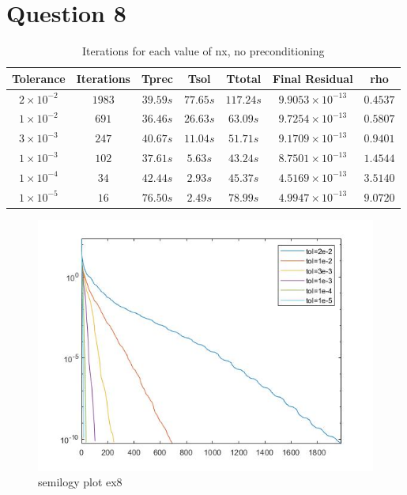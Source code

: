 \documentclass[a4paper, 11pt]{article}
\begin{document}
		
		\section*{Question 8}
		
		\begin{table}[H]
			\centering
			\begin{tabular}{c|c|c|c|c|c|c}
				\textbf{Tolerance} & \textbf{Iterations} & \textbf{Tprec}  & \textbf{Tsol}  & \textbf{Ttotal} & \textbf{Final Residual} & \textbf{rho} \\ \hline
				$2 \times 10^{-2}$ & $1983$	& $ 39.59 s $ 	& $ 77.65 s $ & $ 117.24 s $ 	& $ 9.9053 \times 10^{-13} $ & $ 0.4537 $\\ \hline
				$1 \times 10^{-2}$ & $691$	& $ 36.46 s $ 	& $ 26.63 s $ & $ 63.09 s $ 	& $ 9.7254 \times 10^{-13} $ & $ 0.5807 $\\ \hline
				$3 \times 10^{-3}$ & $247$	& $ 40.67 s $ 	& $ 11.04 s $ & $ 51.71 s $ 	& $ 9.1709 \times 10^{-13} $ & $ 0.9401 $\\ \hline
				$1 \times 10^{-3}$ & $102$	& $ 37.61 s $ 	& $ 5.63 s $ & $ 43.24 s $ 		& $ 8.7501 \times 10^{-13} $ & $ 1.4544 $\\ \hline
				$1 \times 10^{-4}$ & $34$	& $ 42.44 s $ 	& $ 2.93 s $ & $ 45.37 s $ 		& $ 4.5169 \times 10^{-13} $ & $ 3.5140 $\\ \hline
				$1 \times 10^{-5}$ & $16$	& $ 76.50 s $ 	& $ 2.49 s $ & $ 78.99 s $ 		& $ 4.9947 \times 10^{-13} $ & $ 9.0720 $\\ \hline
			\end{tabular}
			\caption{Iterations for each value of nx, no preconditioning}
			\label{table:ex8}
		\end{table}
	
		
		
		\begin{figure}[H]
			\centering
			\includegraphics[width=.6\linewidth]{ex8.jpg}
			\caption{semilogy plot ex8}
			\label{fig:ex8}
		\end{figure}
	
	
	
\end{document}
